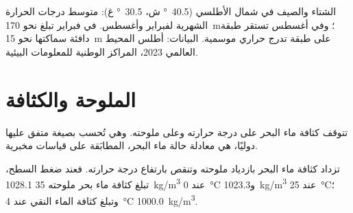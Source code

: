 \begin{omfigure}

{\small الشتاء والصيف في شمال الأطلسي (\qty{40.5}{\degree} ش،
\qty{30.5}{\degree} غ): متوسط درجات الحرارة الشهرية لفبراير وأغسطس.
في فبراير تبلغ  نحو \qty{170}{m}؛ وفي أغسطس تستقر طبقة دافئة
سماكتها نحو \qty{15}{m} على طبقة تدرج حراري موسمية. البيانات: أطلس المحيط العالمي
2023، المراكز الوطنية للمعلومات البيئية.}
\end{omfigure}

\section{الملوحة والكثافة}

تتوقف كثافة ماء البحر على درجة حرارته وعلى ملوحته. وهي تُحسب بصيغة متفق عليها
دوليًا، هي معادلة حالة ماء البحر، المطابَقة على قياسات
مخبرية.

\begin{proposition}\label{prop:g10:layered-ocean:density}
تزداد كثافة ماء البحر بازدياد ملوحته وتنقص بارتفاع درجة حرارته. فعند ضغط السطح،
تبلغ كثافة ماء بحر ملوحته 35 \qty{1028.1}{kg/m^3} عند
\qty{0}{\degreeCelsius} و\qty{1023.3}{kg/m^3} عند \qty{25}{\degreeCelsius}؛ وتبلغ
كثافة الماء النقي عند \qty{4}{\degreeCelsius}
\qty{1000.0}{kg/m^3}.
\end{proposition}


